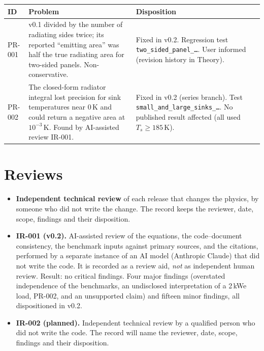 \documentclass[11pt]{article}
\begin{document}
\begin{longtable}{>{\ttfamily}p{}p{}p{}}
\toprule
ID & Problem & Disposition \\
\midrule
\endhead
PR-001 & v0.1 divided by the number of radiating sides twice; its reported ``emitting area'' was half the true radiating area for two-sided panels. Non-conservative. & Fixed in v0.2. Regression test \texttt{two\_sided\_\allowbreak{}panel\_\allowbreak{}\ldots}. User informed (revision history in Theory). \\
PR-002 & The closed-form radiator integral lost precision for sink temperatures near 0\,K and could return a negative area at $10^{-3}$\,K. Found by AI-assisted review IR-001. & Fixed in v0.2 (series branch). Test \texttt{small\_and\_\allowbreak{}large\_\allowbreak{}sinks\_\allowbreak{}\ldots}. No published result affected (all used $T_s\ge185$\,K). \\
\bottomrule
\end{longtable}

\section{Reviews}\label{sec:reviews}
\begin{itemize}
  \item \textbf{Independent technical review} of each release that changes the physics,
        by someone who did not write the change. The record keeps the reviewer, date,
        scope, findings and their disposition.
  \item \textbf{IR-001 (v0.2).} AI-assisted review of the equations, the code--document
        consistency, the benchmark inputs against primary sources, and the citations,
        performed by a separate instance of an AI model (Anthropic Claude) that did not
        write the code. It is recorded as a review aid, \emph{not} as independent human
        review.
        Result: no critical findings. Four major findings (overstated independence of the
        benchmarks, an undisclosed interpretation of a 2\,kWe load, PR-002, and an
        unsupported claim) and fifteen minor findings, all dispositioned in v0.2.
  \item \textbf{IR-002 (planned).} Independent technical review by a qualified person who
        did not write the code. The record will name the reviewer, date, scope, findings
        and their disposition.
\end{itemize}
\end{document}
